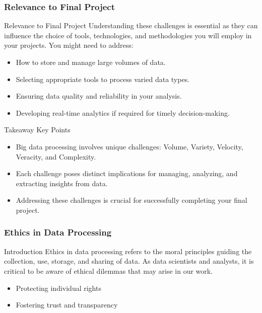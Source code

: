 \documentclass[aspectratio=169]{beamer}
\begin{document}
\begin{frame}[fragile]
    \frametitle{Relevance to Final Project}
    \begin{block}{Relevance to Final Project}
        Understanding these challenges is essential as they can influence the choice of tools, technologies, and methodologies you will employ in your projects. You might need to address:
        \begin{itemize}
            \item How to store and manage large volumes of data.
            \item Selecting appropriate tools to process varied data types.
            \item Ensuring data quality and reliability in your analysis.
            \item Developing real-time analytics if required for timely decision-making.
        \end{itemize}
    \end{block}
    
    \begin{block}{Takeaway Key Points}
        \begin{itemize}
            \item Big data processing involves unique challenges: Volume, Variety, Velocity, Veracity, and Complexity.
            \item Each challenge poses distinct implications for managing, analyzing, and extracting insights from data.
            \item Addressing these challenges is crucial for successfully completing your final project.
        \end{itemize}
    \end{block}
\end{frame}

\begin{frame}[fragile]
    \frametitle{Ethics in Data Processing}
    \begin{block}{Introduction}
        Ethics in data processing refers to the moral principles guiding the collection, use, storage, and sharing of data. As data scientists and analysts, it is critical to be aware of ethical dilemmas that may arise in our work.
    \end{block}
    \begin{itemize}
        \item Protecting individual rights
        \item Fostering trust and transparency
    \end{itemize}
\end{frame}
\end{document}
